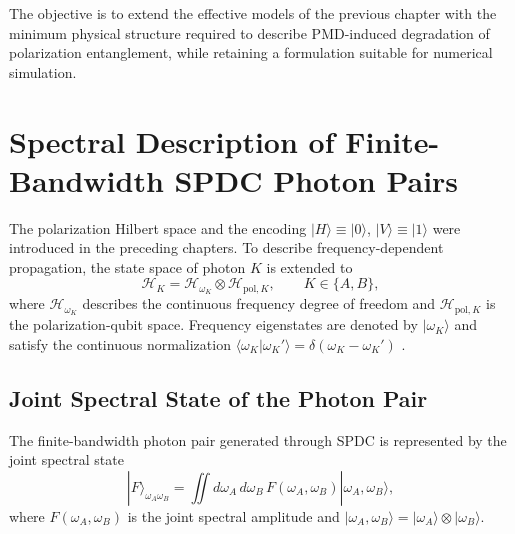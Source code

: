 The objective is to extend the effective models of the previous chapter with
the minimum physical structure required to describe PMD-induced degradation
of polarization entanglement, while retaining a formulation suitable for
numerical simulation.


\section{Spectral Description of Finite-Bandwidth SPDC Photon Pairs}
\label{sec:spectral_description_spdc}

The polarization Hilbert space and the encoding
\(|H\rangle\equiv|0\rangle\), \(|V\rangle\equiv|1\rangle\) were introduced
in the preceding chapters. To describe frequency-dependent propagation, the
state space of photon \(K\) is extended to
%
\begin{equation}
    \mathcal{H}_K
    =
    \mathcal{H}_{\omega_K}
    \otimes
    \mathcal{H}_{\mathrm{pol},K},
    \qquad
    K\in\{A,B\},
    \label{eq:single_photon_frequency_polarization_space}
\end{equation}
%
where \(\mathcal{H}_{\omega_K}\) describes the continuous frequency degree
of freedom and \(\mathcal{H}_{\mathrm{pol},K}\) is the polarization-qubit
space. Frequency eigenstates are denoted by \(|\omega_K\rangle\) and satisfy
the continuous normalization
\(\langle\omega_K|\omega_K'\rangle
=\delta(\omega_K-\omega_K')\)
\cite{nielsen_chuang_qcqi,poon_law_stochastic_pmd_2008}.


\subsection{Joint Spectral State of the Photon Pair}
\label{subsec:two_photon_spdc_spectral_state}

The finite-bandwidth photon pair generated through SPDC is represented by
the joint spectral state
%
\begin{equation}
    |F\rangle_{\omega_A\omega_B}
    =
    \iint
    d\omega_A\,d\omega_B\,
    F(\omega_A,\omega_B)
    |\omega_A,\omega_B\rangle,
    \label{eq:spdc_two_photon_spectral_state}
\end{equation}
%
where \(F(\omega_A,\omega_B)\) is the joint spectral amplitude and
\(|\omega_A,\omega_B\rangle
=|\omega_A\rangle\otimes|\omega_B\rangle\).

